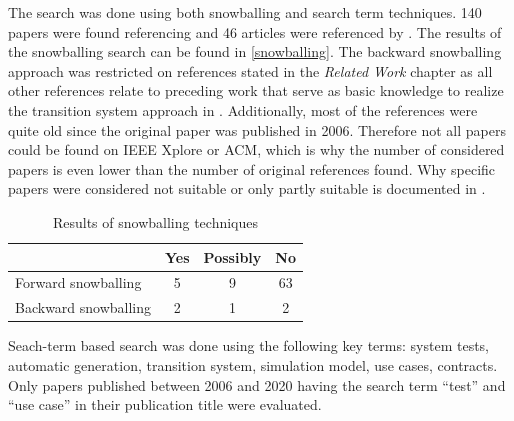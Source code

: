 The search was done using both snowballing and search term techniques. 140 papers were found referencing \cite{ClementineNebut2006} and 46 articles were referenced by \cite{ClementineNebut2006}. The results of the snowballing search can be found in \autoref{snowballing}. The backward snowballing approach was restricted on references stated in the \textit{Related Work} chapter as all other references relate to preceding work that serve as basic knowledge to realize the transition system approach in \cite{ClementineNebut2006}. Additionally, most of the references were quite old since the original paper was published in 2006. Therefore not all papers could be found on IEEE Xplore or ACM, which is why the number of considered papers is even lower than the number of original references found. Why specific papers were considered not suitable or only partly suitable is documented in \cite{FelixHausberger2020}.

\begin{small}
	\begin{longtable}{l|c|c|c}
		\caption{Results of snowballing techniques}
		\label{snowballing}	
		\\    %
		\hline
		 & \textbf{Yes} & \textbf{Possibly} & \textbf{No} \\
		\hline	
		Forward snowballing & 5 & 9 & 63 \\
		\hline
		Backward snowballing & 2 & 1 & 2 \\
		\hline
	\end{longtable}
\end{small}


Seach-term based search was done using the following key terms: system tests, automatic generation, transition system, simulation model, use cases, contracts. Only papers published between 2006 and 2020 having the search term \enquote{test} and \enquote{use case} in their publication title were evaluated. 

\newpage


